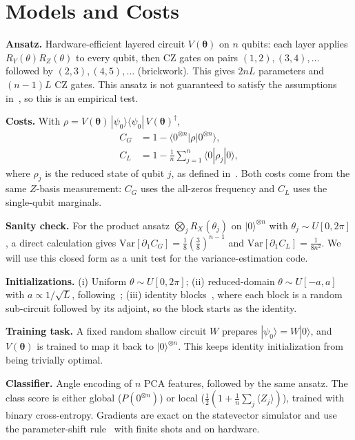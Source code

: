 \documentclass[conference]{IEEEtran}
\begin{document}
\section{Models and Costs}
\textbf{Ansatz.} Hardware-efficient layered circuit $V(\boldsymbol\theta)$ on $n$
qubits: each layer applies $R_Y(\theta)R_Z(\theta)$ to every qubit, then CZ
gates on pairs $(1,2),(3,4),\dots$ followed by $(2,3),(4,5),\dots$ (brickwork).
This gives $2nL$ parameters and $(n-1)L$ CZ gates. This ansatz is not
guaranteed to satisfy the assumptions in~\cite{cerezo2021}, so this is an
empirical test.

\textbf{Costs.} With $\rho=V(\boldsymbol\theta)\,|\psi_0\rangle\langle\psi_0|\,V(\boldsymbol\theta)^\dagger$,
\begin{align}
C_G &= 1-\langle 0^{\otimes n}|\rho|0^{\otimes n}\rangle,\\
C_L &= 1-\tfrac{1}{n}\textstyle\sum_{j=1}^{n}\langle 0|\rho_j|0\rangle,
\end{align}
where $\rho_j$ is the reduced state of qubit $j$, as defined in~\cite{cerezo2021}.
Both costs come from the same $Z$-basis measurement: $C_G$ uses the
all-zeros frequency and $C_L$ uses the single-qubit marginals.

\textbf{Sanity check.} For the product ansatz $\bigotimes_j R_X(\theta_j)$ on
$|0\rangle^{\otimes n}$ with $\theta_j\sim U[0,2\pi]$, a direct calculation gives
$\mathrm{Var}[\partial_1 C_G]=\tfrac18(\tfrac38)^{n-1}$ and
$\mathrm{Var}[\partial_1 C_L]=\tfrac{1}{8n^2}$. We will use this closed form as
a unit test for the variance-estimation code.

\textbf{Initializations.} (i) Uniform $\theta\sim U[0,2\pi]$;
(ii) reduced-domain $\theta\sim U[-a,a]$ with $a\propto 1/\sqrt{L}$, following~\cite{wangqi2024};
(iii) identity blocks~\cite{grant2019}, where each block is a random sub-circuit
followed by its adjoint, so the block starts as the identity.

\textbf{Training task.} A fixed random shallow circuit $W$ prepares
$|\psi_0\rangle=W|0\rangle$, and $V(\boldsymbol\theta)$ is trained to map it back
to $|0\rangle^{\otimes n}$. This keeps identity initialization from being
trivially optimal.

\textbf{Classifier.} Angle encoding of $n$ PCA features, followed by the same
ansatz. The class score is either global ($P(0^{\otimes n})$) or local
($\tfrac12(1+\tfrac1n\sum_j\langle Z_j\rangle)$), trained with binary
cross-entropy. Gradients are exact on the statevector simulator and use the
parameter-shift rule~\cite{schuld2019} with finite shots and on hardware.
\end{document}
